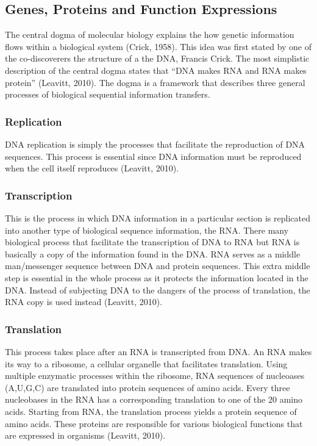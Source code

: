 \documentclass[]{report}
\begin{document}
\subsection{Genes, Proteins and Function
Expressions}\label{genes-proteins-and-function-expressions}

The central dogma of molecular biology explains the how genetic
information flows within a biological system (Crick, 1958). This idea
was first stated by one of the co-discoverers the structure of a the
DNA, Francis Crick. The most simplistic description of the central dogma
states that ``DNA makes RNA and RNA makes protein'' (Leavitt, 2010). The
dogma is a framework that describes three general processes of
biological sequential information transfers.

\subsubsection{Replication}\label{replication}

DNA replication is simply the processes that facilitate the reproduction
of DNA sequences. This process is essential since DNA information must
be reproduced when the cell itself reproduces (Leavitt, 2010).

\subsubsection{Transcription}\label{transcription}

This is the process in which DNA information in a particular section is
replicated into another type of biological sequence information, the
RNA. There many biological process that facilitate the transcription of
DNA to RNA but RNA is basically a copy of the information found in the
DNA. RNA serves as a middle man/messenger sequence between DNA and
protein sequences. This extra middle step is essential in the whole
process as it protects the information located in the DNA. Instead of
subjecting DNA to the dangers of the process of translation, the RNA
copy is used instead (Leavitt, 2010).

\subsubsection{Translation}\label{translation}

This process takes place after an RNA is transcripted from DNA. An RNA
makes its way to a ribosome, a cellular organelle that facilitates
translation. Using multiple enzymatic processes within the ribosome, RNA
sequences of nucleoases (A,U,G,C) are translated into protein sequences
of amino acids. Every three nucleobases in the RNA has a corresponding
translation to one of the 20 amino acids. Starting from RNA, the
translation process yields a protein sequence of amino acids. These
proteins are responsible for various biological functions that are
expressed in organisms (Leavitt, 2010).
\end{document}

